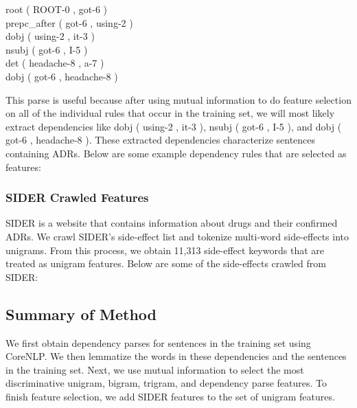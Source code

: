 \documentclass{acm_proc_article-sp}
\begin{document}
root ( ROOT-0 , got-6 ) \\
prepc\_after ( got-6 , using-2 ) \\
dobj ( using-2 , it-3 ) \\ 
nsubj ( got-6 , I-5 ) \\
det ( headache-8 , a-7 ) \\
dobj ( got-6 , headache-8 ) 

This parse is useful because after using mutual information to do feature selection on all of the individual rules that occur in the training set, we will most likely extract dependencies like dobj ( using-2 , it-3 ), nsubj ( got-6 , I-5 ), and dobj ( got-6 , headache-8 ). These extracted dependencies characterize sentences containing ADRs. Below are some example dependency rules that are selected as features:

\noindent{}
\pagebreak
\subsubsection{SIDER Crawled Features}
SIDER is a website that contains information about drugs and their confirmed ADRs. We crawl SIDER's side-effect list and tokenize multi-word side-effects into unigrams. From this process, we obtain 11,313 side-effect keywords that are treated as unigram features. Below are some of the side-effects crawled from SIDER:

\noindent{}

\subsection{Summary of Method}
We first obtain dependency parses for sentences in the training set using CoreNLP. We then lemmatize the words in these dependencies and the sentences in the training set. Next, we use mutual information to select the most discriminative unigram, bigram, trigram, and dependency parse features. To finish feature selection, we add SIDER features to the set of unigram features. 
\end{document}
